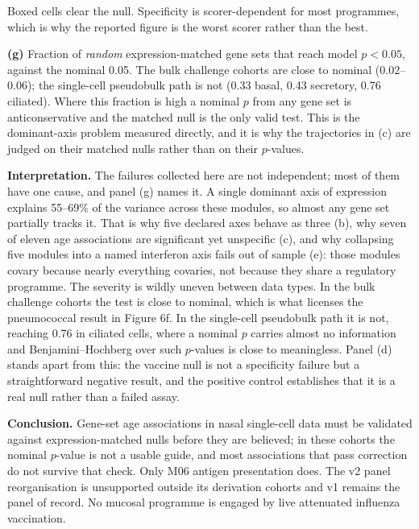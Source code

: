 \documentclass[11pt,a4paper]{article}
\begin{document}
{Boxed cells clear the null. Specificity is scorer-dependent for most programmes, which is why
the reported figure is the worst scorer rather than the best.
\par
\textbf{(g)} Fraction of \emph{random} expression-matched gene sets that reach model $p<0.05$,
against the nominal 0.05. The bulk challenge cohorts are close to nominal (0.02--0.06); the
single-cell pseudobulk path is not (0.33 basal, 0.43 secretory, 0.76 ciliated). Where this
fraction is high a nominal $p$ from any gene set is anticonservative and the matched null is
the only valid test. This is the dominant-axis problem measured directly, and it is why the
trajectories in (c) are judged on their matched nulls rather than on their $p$-values.
\par
\textbf{Interpretation.} The failures collected here are not independent; most of them have
one cause, and panel (g) names it. A single dominant axis of expression explains 55--69\% of
the variance across these modules, so almost any gene set partially tracks it. That is why
five declared axes behave as three (b), why seven of eleven age associations are significant
yet unspecific (c), and why collapsing five modules into a named interferon axis fails
out of sample (e): those modules covary because nearly everything covaries, not because they
share a regulatory programme. The severity is wildly uneven between data types. In the bulk
challenge cohorts the test is close to nominal, which is what licenses the pneumococcal
result in Figure 6f. In the single-cell pseudobulk path it is not, reaching 0.76 in ciliated
cells, where a nominal $p$ carries almost no information and Benjamini--Hochberg over such
$p$-values is close to meaningless. Panel (d) stands apart from this: the vaccine null is not
a specificity failure but a straightforward negative result, and the positive control
establishes that it is a real null rather than a failed assay.
\par
\textbf{Conclusion.} Gene-set age associations in nasal single-cell data must be validated
against expression-matched nulls before they are believed; in these cohorts the nominal
$p$-value is not a usable guide, and most associations that pass correction do not survive
that check. Only M06 antigen presentation does. The v2 panel reorganisation is unsupported
outside its derivation cohorts and v1 remains the panel of record. No mucosal programme is
engaged by live attenuated influenza vaccination.}
\end{document}
